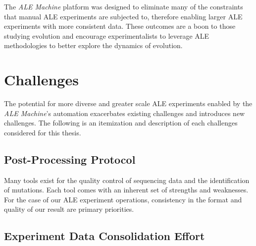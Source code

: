 \documentclass[12pt,final,masters,chapterheads]{ucsd}  %
\begin{document}
The \textit{ALE Machine} platform was designed to eliminate many of the constraints that manual ALE experiments are subjected to, therefore enabling larger ALE experiments with more consistent data. These outcomes are a boon to those studying evolution and encourage experimentalists to leverage ALE methodologies to better explore the dynamics of evolution.

\section{Challenges}

% 
% 

The potential for more diverse and greater scale ALE experiments enabled by the \textit{ALE Machine}'s automation exacerbates existing challenges and introduces new challenges. The following is an itemization and description of each challenges considered for this thesis.

\subsection{Post-Processing Protocol}

Many tools exist for the quality control of sequencing data and the identification of mutations. Each tool comes with an inherent set of strengths and weaknesses. For the case of our ALE experiment operations, consistency in the format and quality of our result are primary priorities. %


\subsection{Experiment Data Consolidation Effort}
\end{document}
